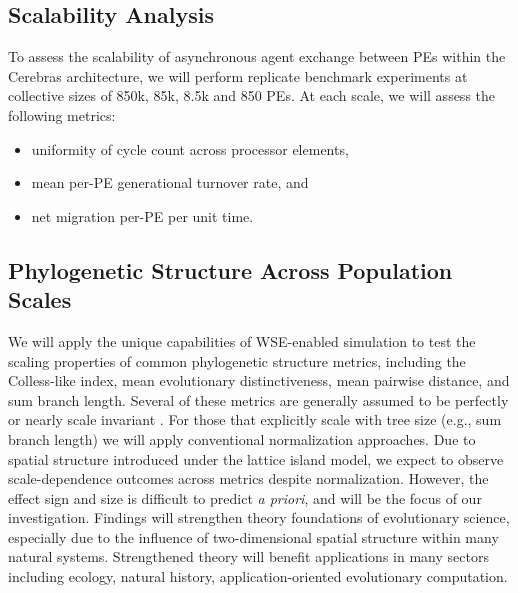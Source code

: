 \subsection{Scalability Analysis}

To assess the scalability of asynchronous agent exchange between PEs within the Cerebras architecture, we will perform replicate benchmark experiments at collective sizes of 850k, 85k, 8.5k and 850 PEs.
At each scale, we will assess the following metrics:
\begin{itemize}
\item uniformity of cycle count across processor elements,
\item mean per-PE generational turnover rate, and
\item net migration per-PE per unit time.
\end{itemize}

\subsection{Phylogenetic Structure Across Population Scales}

We will apply the unique capabilities of WSE-enabled simulation to test the scaling properties of common phylogenetic structure metrics, including the Colless-like index, mean evolutionary distinctiveness, mean pairwise distance, and sum branch length.
Several of these metrics are generally assumed to be perfectly or nearly scale invariant \citep{TODOaskemily}.
For those that explicitly scale with tree size (e.g., sum branch length) we will apply conventional normalization approaches.
Due to spatial structure introduced under the lattice island model, we expect to observe scale-dependence outcomes across metrics despite normalization.
However, the effect sign and size is difficult to predict \textit{a priori}, and will be the focus of our investigation.
Findings will strengthen theory foundations of evolutionary science, especially due to the influence of two-dimensional spatial structure within many natural systems.
Strengthened theory will benefit applications in many sectors including ecology, natural history, application-oriented evolutionary computation.

